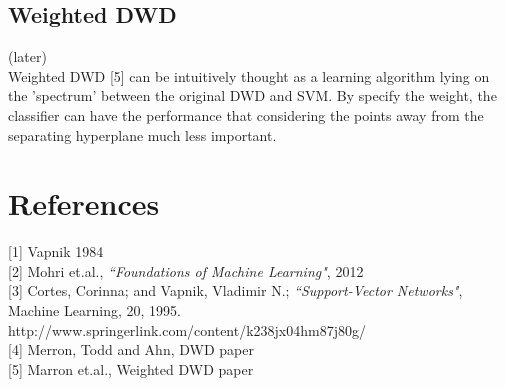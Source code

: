 \documentclass[12pt]{article}
\theoremstyle{definition}
\theoremstyle{remark}
\numberwithin{equation}{section}
\begin{document}
\subsection{Weighted DWD}
(later) \\[0.2cm]
Weighted DWD [5] can be intuitively thought as a learning algorithm lying on the 'spectrum' between the original DWD and SVM. By specify the weight, the classifier can have the performance that considering the points away from the separating hyperplane much less important.
\section{References}
[1] Vapnik 1984 \\[0.2cm]
[2] Mohri et.al., \emph{``Foundations of Machine Learning"}, 2012 \\ [0.2cm]
[3] Cortes, Corinna; and Vapnik, Vladimir N.; \emph{``Support-Vector Networks"}, Machine Learning, 20, 1995.\\ http://www.springerlink.com/content/k238jx04hm87j80g/ \\[0.2cm]
[4] Merron, Todd and Ahn, DWD paper \\[0.2cm]
[5] Marron et.al., Weighted DWD paper
\end{document}
